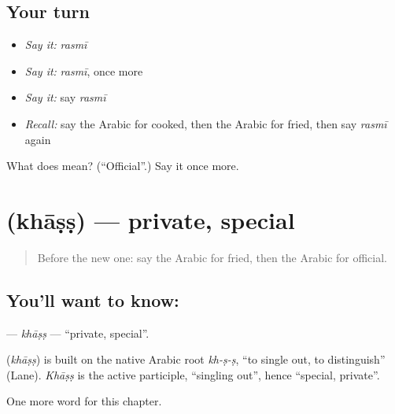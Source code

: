 \subsection*{Your turn}
\begin{itemize}
\raggedright
  \item \emph{Say it:} \emph{rasmī}
  \item \emph{Say it:} \emph{rasmī}, once more
  \item \emph{Say it:} say \emph{rasmī}
  \item \emph{Recall:} say the Arabic for cooked, then the Arabic for fried, then say \emph{rasmī} again
\end{itemize}

\begin{tcolorbox}[breakable,colback=teal!4,colframe=teal!35!black,title={Before you move on}]
What does  mean? (\textquotedblleft{}Official\textquotedblright{}.) Say it once more.
\end{tcolorbox}
\section[\texorpdfstring{\ar{خاص} (khāṣṣ)}{خاص (khāṣṣ)}]{ (khāṣṣ) — private, special}

\label{lesson:AR-C178-khass}



\begin{quote}
Before the new one: say the Arabic for fried, then the Arabic for official.
\end{quote}

\subsection*{You'll want to know: }
\textbf{} — \emph{khāṣṣ} — \textquotedblleft{}private, special\textquotedblright{}.

\begin{cousinweb}
\textbf{} (\emph{khāṣṣ}) is built on the native Arabic root \emph{kh-ṣ-ṣ}, \textquotedblleft{}to single out, to distinguish\textquotedblright{} (Lane). \emph{Khāṣṣ} is the active participle, \textquotedblleft{}singling out\textquotedblright{}, hence \textquotedblleft{}special, private\textquotedblright{}.
\end{cousinweb}

\begin{grammarlens}[title={What you've built}]
One more word for this chapter.
\end{grammarlens}

